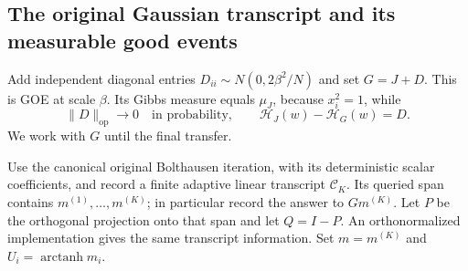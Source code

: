\documentclass[11pt,reqno]{amsart}
\begin{document}
\subsection{The original Gaussian transcript and its measurable good events}
\label{curv:old-transcript}

Add independent diagonal entries $D_{ii}\sim N(0,2\beta^2/N)$ and set
$G=J+D$. This is GOE at scale $\beta$. Its Gibbs measure equals $\mu_J$,
because $x_i^2=1$, while
\begin{equation}\label{curv:diagonal}
 \|D\|_{\mathrm{op}}\longrightarrow0
 \quad\text{in probability},\qquad
 \mathcal H_J(w)-\mathcal H_G(w)=D.
\end{equation}
We work with $G$ until the final transfer.

Use the canonical original Bolthausen iteration, with its deterministic
scalar coefficients, and record a finite adaptive linear transcript
$\mathcal C_K$. Its queried span contains
$m^{(1)},\ldots,m^{(K)}$; in particular record the answer to $Gm^{(K)}$.
Let $P$ be the orthogonal projection onto that span and let $Q=I-P$.
An orthonormalized implementation gives the same transcript information.
Set $m=m^{(K)}$ and $U_i=\operatorname{arctanh}m_i$.
\end{document}
